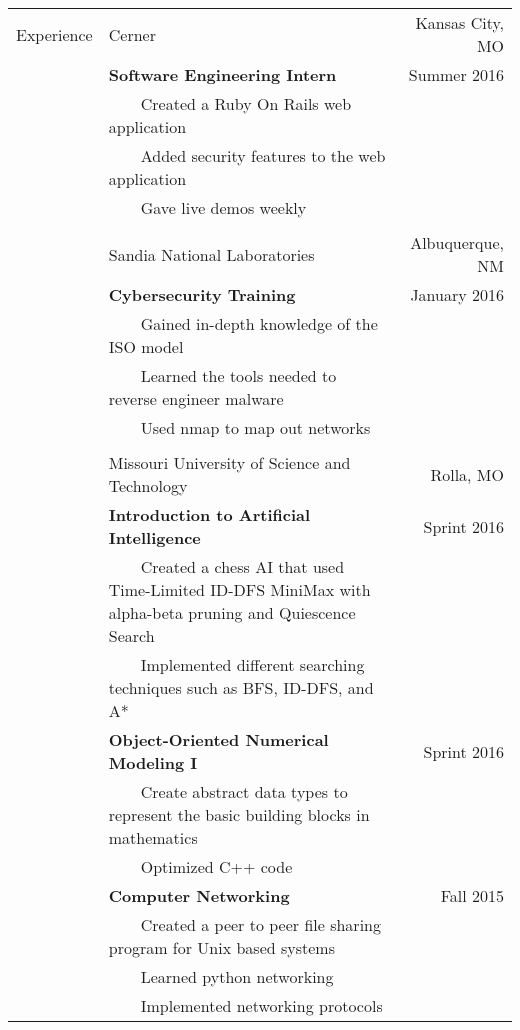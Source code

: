 \documentclass{article}
\newcommand{\tabitem}{~~\llap{\textbullet}~~}
\begin{document}
\begin{tabular}{p{1.5cm} p{12.9cm} r}
Experience  & Cerner 															& Kansas City, MO 		\\
			& \textbf{Software Engineering Intern} 								& Summer 2016			\\
			& \tabitem Created a Ruby On Rails web application 					& 						\\
			& \tabitem Added security features to the web application			& 						\\
			& \tabitem Gave live demos weekly 									& 						\\ \\

			& Sandia National Laboratories										& Albuquerque, NM 		\\
			& \textbf{Cybersecurity Training} 									& January 2016 			\\
			& \tabitem Gained in-depth knowledge of the ISO model 				& 						\\
			& \tabitem Learned the tools needed to reverse engineer malware 	& 						\\
			& \tabitem Used nmap to map out networks 							& 						\\ \\

			& Missouri University of Science and Technology						& Rolla, MO 			\\
			& \textbf{Introduction to Artificial Intelligence} 					& Sprint 2016 			\\
			& \tabitem Created a chess AI that used	 Time-Limited ID-DFS MiniMax with alpha-beta pruning and Quiescence Search	& \\
			& \tabitem Implemented different searching techniques such as BFS, ID-DFS, and A* 	& 		\\

			& \textbf{Object-Oriented Numerical Modeling I} 					& Sprint 2016 			\\
			& \tabitem Create abstract data types to represent the basic building blocks in mathematics & \\
			& \tabitem Optimized C++ code 										& 						\\

			& \textbf{Computer Networking} 										& Fall 2015 			\\
			& \tabitem Created a peer to peer file sharing program for Unix based systems 		& 		\\
			& \tabitem Learned python networking 								& 						\\
			& \tabitem Implemented networking protocols 						& 						\\


\end{tabular}
\end{document}
